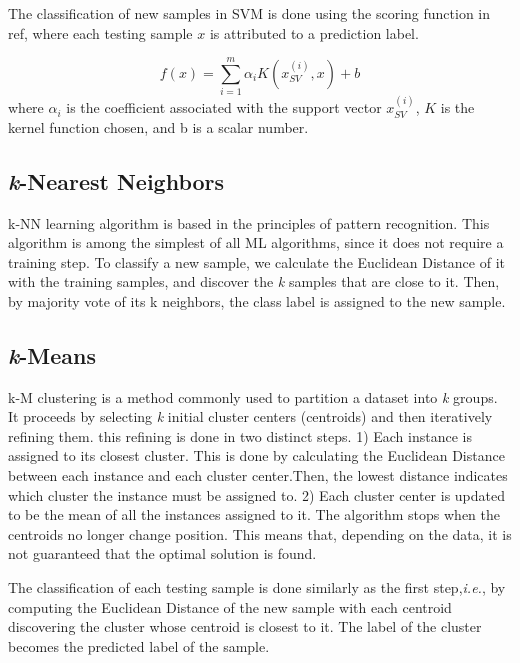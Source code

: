 The classification of new samples in \ac{SVM} is done using the scoring function in ref{}, where each testing sample $x$ is attributed to a prediction label.

\begin{equation}
\label{eq:SVM3}
f(x)=\sum_{i=1}^m \alpha_i K (x_{SV}^{(i)},x)+b
\end{equation}
where $\alpha_i$ is the coefficient associated with the support vector $x_{SV}^{(i)}$, $K$ is the kernel function chosen, and b is a scalar number.


\subsection{\textit{k}-Nearest Neighbors}
\label{ssec:kNearestNeighbors}

\ac{k-NN} learning algorithm is based in the principles of pattern recognition. This algorithm is among the simplest of all \ac{ML} algorithms, since it does not require a training step. To classify a new sample, we calculate the Euclidean Distance of it with the training samples, and discover the \textit{k} samples that are close to it. Then, by majority vote of its {k} neighbors, the class label is assigned to the new sample.


\subsection{\textit{k}-Means}
\label{ssec:kMeans}

\ac{k-M} clustering is a method commonly used to partition a dataset into \textit{k} groups. It proceeds by selecting \textit{k} initial cluster centers (centroids) and then iteratively refining them. this refining is done in two distinct steps. 1) Each instance is assigned to its closest cluster. This is done by calculating the Euclidean Distance between each instance and each cluster center.Then, the lowest distance indicates which cluster the instance must be assigned to. 2) Each cluster center is updated to be the mean of all the instances assigned to it.
The algorithm stops when the centroids no longer change position. This means that, depending on the data, it is not guaranteed that the optimal solution is found.

The classification of each testing sample is done similarly as the first step,\textit{i.e.}, by computing the Euclidean Distance of the new sample with each centroid discovering the cluster whose centroid is closest to it. The label of the cluster becomes the predicted label of the sample.



